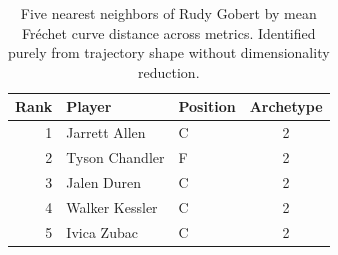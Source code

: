 \begin{table}[htbp]
  \centering\small
  \begin{tabular}{rllc}
    \toprule
    Rank & Player & Position & Archetype \\
    \midrule
    1 & Jarrett Allen & C & 2 \\
    2 & Tyson Chandler & F & 2 \\
    3 & Jalen Duren & C & 2 \\
    4 & Walker Kessler & C & 2 \\
    5 & Ivica Zubac & C & 2 \\
    \bottomrule
  \end{tabular}
  \caption{Five nearest neighbors of Rudy Gobert by mean Fr\'{e}chet curve distance across metrics. Identified purely from trajectory shape without dimensionality reduction.}
  \label{tab:Rudy_Gobert_frechet_curve_neighbors}
\end{table}

